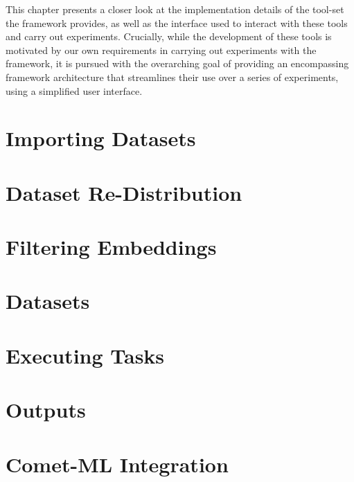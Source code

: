 \documentclass[../../fyp.tex]{subfiles}
\begin{document}
 
This chapter presents a closer look at the implementation details of the tool-set the framework provides, as well as the interface used to interact with these tools and carry out experiments. Crucially, while the development of these tools is motivated by our own requirements in carrying out experiments with the framework, it is pursued with the overarching goal of providing an encompassing framework architecture that streamlines their use over a series of experiments, using a simplified user interface. 

\section{Importing Datasets} \label{sec:importing_datasets}


\section{Dataset Re-Distribution} \label{sec:dataset_redist}


\section{Filtering Embeddings} \label{sec:filtering_embeddings}


\section{Datasets} \label{sec:datasets}


\section{Executing Tasks} \label{sec:executing_tasks}


\section{Outputs}


\section{Comet-ML Integration}

\end{document}

